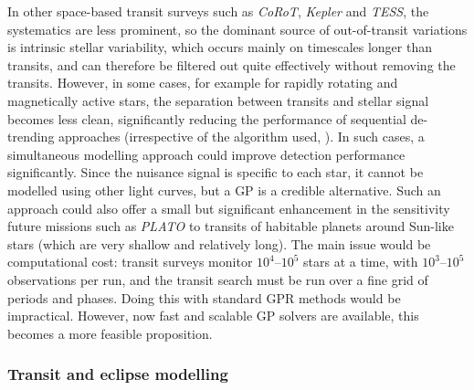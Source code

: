 \documentclass[letterpaper]{ar-1col}
\begin{document}
In other space-based transit surveys such as \textit{CoRoT}, \emph{Kepler} and \emph{TESS}, the systematics are less prominent, so the dominant source of out-of-transit variations is intrinsic stellar variability, which occurs mainly on timescales longer than transits, and can therefore be filtered out quite effectively without removing the transits. However, in some cases, for example for rapidly rotating and magnetically active stars, the separation between transits and stellar signal becomes less clean, significantly reducing the performance of sequential de-trending approaches (irrespective of the algorithm used, \citealt{wotan}).
In such cases, a simultaneous modelling approach could improve detection performance significantly. Since the nuisance signal is specific to each star, it cannot be modelled using other light curves, but a GP is a credible alternative. Such an approach could also offer a small but significant enhancement in the sensitivity future missions such as \textit{PLATO} to transits of habitable planets around Sun-like stars (which are very shallow and relatively long). The main issue would be computational cost: transit surveys monitor $10^4$--$10^5$ stars at a time, with $10^3$--$10^5$ observations per run, and the transit search must be run over a fine grid of periods and phases. Doing this with standard GPR methods would be impractical. However, now fast and scalable GP solvers are available, this becomes a more feasible proposition.

\subsubsection{Transit and eclipse modelling}
\label{sec:transit_fit}
\end{document}
